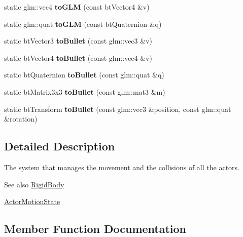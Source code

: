 \begin{DoxyCompactItemize}
static glm\+::vec4 {\bfseries to\+G\+LM} (const bt\+Vector4 \&v)
\item 
\mbox{\label{classTarbora_1_1PhysicsEngine_a5ed0379e3da6a98bfe096eb250889227}} 
static glm\+::quat {\bfseries to\+G\+LM} (const bt\+Quaternion \&q)
\item 
\mbox{\label{classTarbora_1_1PhysicsEngine_a82edb7f2720d79f13933ce60a4a708b2}} 
static bt\+Vector3 {\bfseries to\+Bullet} (const glm\+::vec3 \&v)
\item 
\mbox{\label{classTarbora_1_1PhysicsEngine_a88846e206c0cffd9e2f9e6917da4001c}} 
static bt\+Vector4 {\bfseries to\+Bullet} (const glm\+::vec4 \&v)
\item 
\mbox{\label{classTarbora_1_1PhysicsEngine_ab42d49722aca9b372579d0bc9562c0ee}} 
static bt\+Quaternion {\bfseries to\+Bullet} (const glm\+::quat \&q)
\item 
\mbox{\label{classTarbora_1_1PhysicsEngine_a630504e05b5323e1d8d14fc91356f301}} 
static bt\+Matrix3x3 {\bfseries to\+Bullet} (const glm\+::mat3 \&m)
\item 
\mbox{\label{classTarbora_1_1PhysicsEngine_ad66248f29d0ecf1504e5ca69b6e9d5ce}} 
static bt\+Transform {\bfseries to\+Bullet} (const glm\+::vec3 \&position, const glm\+::quat \&rotation)
\end{DoxyCompactItemize}


\subsection{Detailed Description}
The system that manages the movement and the collisions of all the actors. 

\begin{DoxySeeAlso}{See also}
\hyperlink{classTarbora_1_1RigidBody}{Rigid\+Body} 

\hyperlink{classTarbora_1_1ActorMotionState}{Actor\+Motion\+State} 
\end{DoxySeeAlso}


\subsection{Member Function Documentation}
\mbox{\label{classTarbora_1_1PhysicsEngine_a91b5135f470a3648242224fa34358d71}} 
